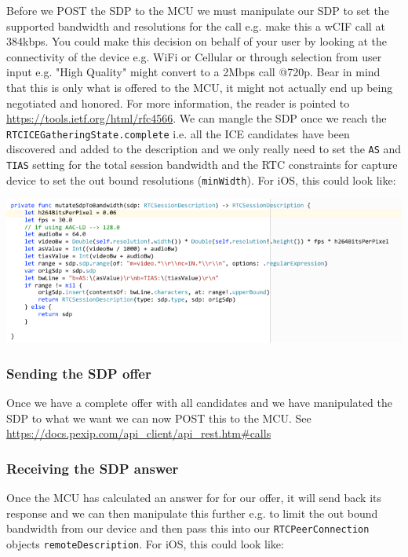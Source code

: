 \documentclass[a4paper,11pt]{article}
\begin{document}
Before we POST the SDP to the MCU we must manipulate our SDP to set
the supported bandwidth and resolutions for the call e.g. make this a
wCIF call at 384kbps.  You could make this decision on behalf of your
user by looking at the connectivity of the device e.g. WiFi or
Cellular or through selection from user input e.g. "High Quality"
might convert to a 2Mbps call @720p.  Bear in mind that this is only
what is offered to the MCU, it might not actually end up being
negotiated and honored.  For more information, the reader is pointed
to \url{https://tools.ietf.org/html/rfc4566}.  We can mangle the SDP once we
reach the \texttt{RTCICEGatheringState.complete} i.e. all the ICE candidates
have been discovered and added to the description and we only really
need to set the \texttt{AS} and \texttt{TIAS} setting for the total session
bandwidth and the RTC constraints for capture device to set the out bound
resolutions (\texttt{minWidth}).  For iOS, this could look like:

\includegraphics[width=.9\linewidth]{./images/sdp_mutation_functions.png}

\subsubsection{Sending the SDP offer}
\label{sec:orgheadline24}

Once we have a complete offer with all candidates and we have
manipulated the SDP to what we want we can now POST this to the MCU.  
See \url{https://docs.pexip.com/api_client/api_rest.htm#calls}

\subsubsection{Receiving the SDP answer}
\label{sec:orgheadline25}

Once the MCU has calculated an answer for for our offer, it will send
back its response and we can then manipulate this further e.g. to
limit the out bound bandwidth from our device and then pass this into
our \texttt{RTCPeerConnection} objects \texttt{remoteDescription}. For iOS, this
could look like:
\end{document}
